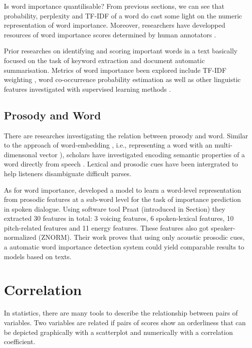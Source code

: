 Is word importance quantilisable? From previous sections, we can see that probability, perplexity and TF-IDF of a word do cast some light on the numeric representation of word importance. Moreover, researchers have developped resources of word importance scores determined by human annotators \citep{Kafle2018}. 
 
Prior researches on identifying and scoring important words in a text basically focused on the task of keyword extraction and document automatic summarisation. Metrics of word importance been explored include TF-IDF weighting \citep{HaCohen-Kerner2010}, word co-occurrence probability estimation \citep{Y.MATSUO2004} as well as other linguistic features investigated with supervised learning methods \citep{Liu2011, I.Sheeba2012, Murdoch2018}. 

\subsection{Prosody and Word}
There are researches investigating the relation between prosody and word. Similar to the approach of word-embedding \citep{Mikolov2013}, i.e., representing a word with an multi-dimensonal vector ), scholars have investigated encoding semantic properties of a word directly from speech \citep{Chung2018}. Lexical and prosodic cues have been intergrated to help listeners disambiguate difficult parses\citep{Tran2018}.

As for word importance, \citet{Kafle2019} developed a model to learn a word-level representation from prosodic features at a sub-word level for the task of importance prediction in spoken dialogue. Using software tool Praat (introduced in Section) they extracted 30 features in total: 3 voicing features, 6 spoken-lexical features, 10 pitch-related features and 11 energy features. These features also got speaker-normalized (ZNORM). Their work proves that using only acoustic prosodic cues, a automatic word importance detection system could yield comparable results to models based on texts.

\section{Correlation}
In statistics, there are many tools to describe the relationship between pairs of variables. Two variables are related if pairs of scores show an orderliness that can be depicted graphically with a scatterplot and numerically with a correlation coefficient.

